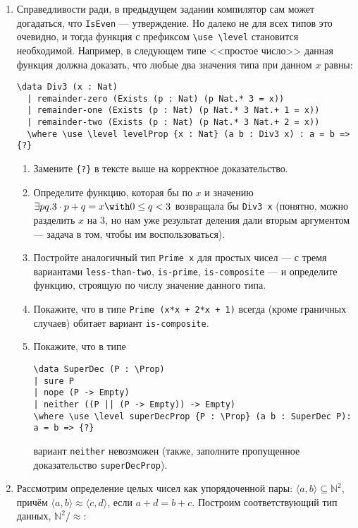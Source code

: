 \documentclass[10pt,a4paper,oneside]{article}
\begin{document}
\begin{enumerate}
\begin{verbatim}
\func even-is-dec (a : Nat) : Dec (IsEven a) \elim a
  | 0 => yes zero-is-even
  | 1 => no {?}
  | suc (suc a) => {?}
\end{verbatim}

\item Справедливости ради, в предыдущем задании компилятор сам может догадаться, что \verb!IsEven! --- утверждение.
Но далеко не для всех типов это очевидно, и тогда функция с префиксом \verb!\use \level! становится необходимой.
Например, в следующем типе <<простое число>> данная функция должна доказать, что любые два значения типа при данном $x$ равны:

\begin{verbatim}
\data Div3 (x : Nat)
  | remainder-zero (Exists (p : Nat) (p Nat.* 3 = x))
  | remainder-one (Exists (p : Nat) (p Nat.* 3 Nat.+ 1 = x))
  | remainder-two (Exists (p : Nat) (p Nat.* 3 Nat.+ 2 = x))
  \where \use \level levelProp {x : Nat} (a b : Div3 x) : a = b => {?}
\end{verbatim}

\begin{enumerate}
\item Замените \verb!{?}! в тексте выше на корректное доказательство.
\item Определите функцию, которая бы по $x$ и значению $\exists p q.3 \cdot p + q = x \with 0 \le q < 3$ возвращала бы \verb!Div3 x!
(понятно, можно разделить $x$ на 3, но нам уже результат деления дали вторым аргументом --- задача в том, чтобы им воспользоваться).
\item Постройте аналогичный тип \verb!Prime x! для простых чисел --- с тремя вариантами \verb!less-than-two!, \verb!is-prime!, 
\verb!is-composite! --- и определите функцию, строящую по числу значение данного типа.
\item Покажите, что в типе \verb!Prime (x*x + 2*x + 1)! всегда (кроме граничных случаев) обитает вариант \verb!is-composite!.
\item Покажите, что в типе 
\begin{verbatim}
\data SuperDec (P : \Prop)
| sure P
| nope (P -> Empty)
| neither ((P || (P -> Empty)) -> Empty)
\where \use \level superDecProp {P : \Prop} (a b : SuperDec P): a = b => {?}
\end{verbatim}
вариант \verb!neither! невозможен (также, заполните пропущенное доказательство \verb!superDecProp!).
\end{enumerate}

\item Рассмотрим определение целых чисел как упорядоченной пары: $\langle a,b\rangle \subseteq \mathbb{N}^2$,
причём $\langle a,b\rangle \approx \langle c,d\rangle$, если $a + d = b + c$. Построим соответствующий тип
данных, $\mathbb{N}^2/\approx$:


\end{enumerate}
\end{document}
